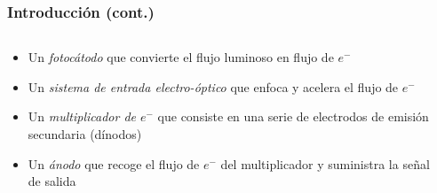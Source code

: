 \documentclass{beamer}
\begin{document}
\begin{frame}
\frametitle{Introducción (cont.)}
\begin{columns}
\begin{column}{0.6\textwidth}
\begin{itemize}
\item  Un {\color{blue}\textit{fotocátodo}} que convierte el flujo luminoso en flujo de $e^-$
\item Un {\color{blue}\textit{sistema de entrada electro-óptico}} que enfoca y acelera el flujo de $e^-$
\item Un {\color{blue}\textit{multiplicador de $e^-$}} que consiste en una serie de electrodos de emisión 
secundaria (dínodos)
\item Un {\color{blue}\textit{ánodo}} que recoge el flujo de $e^-$ del multiplicador y suministra la señal 
de salida
\end{itemize}
\end{column}
\begin{column}{0.4\textwidth}

\end{column}
\end{columns}
\end{frame}
\end{document}
